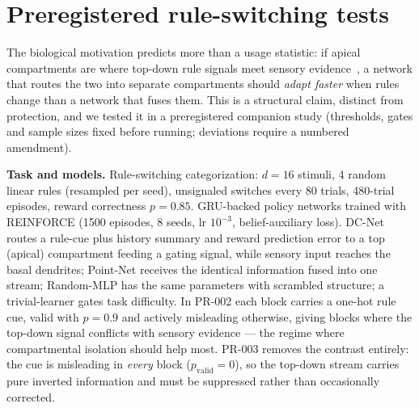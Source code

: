 \documentclass[conference]{IEEEtran}
\begin{document}
\section{Preregistered rule-switching tests}\label{sec:prereg}
The biological motivation predicts more than a usage statistic: if apical compartments are where
top-down rule signals meet sensory evidence~\cite{zhang2026}, a network that routes the two into
separate compartments should \emph{adapt faster} when rules change than a network that fuses them.
This is a structural claim, distinct from protection, and we tested it in a preregistered
companion study (thresholds, gates and sample sizes fixed before running; deviations require a
numbered amendment).

\noindent\textbf{Task and models.} Rule-switching categorization: $d=16$ stimuli, 4 random linear
rules (resampled per seed), unsignaled switches every 80 trials, 480-trial episodes, reward
correctness $p=0.85$. GRU-backed policy networks trained with REINFORCE (1500 episodes, 8 seeds,
lr $10^{-3}$, belief-auxiliary loss). DC-Net routes a rule-cue plus history summary and reward
prediction error to a top (apical) compartment feeding a gating signal, while sensory input
reaches the basal dendrites; Point-Net receives the identical information fused into one stream;
Random-MLP has the same parameters with scrambled structure; a trivial-learner gates task
difficulty. In PR-002 each block carries a one-hot rule cue, valid with $p=0.9$ and actively
misleading otherwise, giving blocks where the top-down signal conflicts with sensory evidence ---
the regime where compartmental isolation should help most. PR-003 removes the contrast entirely:
the cue is misleading in \emph{every} block ($p_{\text{valid}}=0$), so the top-down stream carries
pure inverted information and must be suppressed rather than occasionally corrected.
\end{document}
